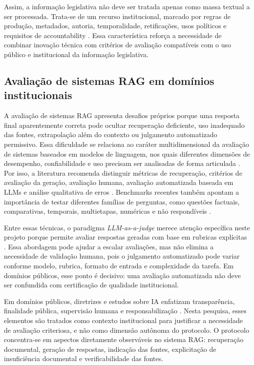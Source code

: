 Assim, a informação legislativa não deve ser tratada apenas como massa textual a ser processada. Trata-se de um recurso institucional, marcado por regras de produção, metadados, autoria, temporalidade, retificações, usos políticos e requisitos de accountability \parencite{bandeiraBernardes2016information,martelloteViola2025organizacaoConhecimento}. Essa característica reforça a necessidade de combinar inovação técnica com critérios de avaliação compatíveis com o uso público e institucional da informação legislativa.

\subsection{Avaliação de sistemas RAG em domínios institucionais}

A avaliação de sistemas RAG apresenta desafios próprios porque uma resposta final aparentemente correta pode ocultar recuperação deficiente, uso inadequado das fontes, extrapolação além do contexto ou julgamento automatizado permissivo. Essa dificuldade se relaciona ao caráter multidimensional da avaliação de sistemas baseados em modelos de linguagem, nos quais diferentes dimensões de desempenho, confiabilidade e uso precisam ser analisadas de forma articulada \parencite{liangEtAl2023helm}. Por isso, a literatura recomenda distinguir métricas de recuperação, critérios de avaliação da geração, avaliação humana, avaliação automatizada baseada em LLMs e análise qualitativa de erros \parencite{saadFalconEtAl2024ares,esEtAl2023ragas,pipitoneAlami2024legalbenchRag}. Benchmarks recentes também apontam a importância de testar diferentes famílias de perguntas, como questões factuais, comparativas, temporais, multietapas, numéricas e não respondíveis \parencite{zhuEtAl2025rageval}.

Entre essas técnicas, o paradigma \textit{LLM-as-a-judge} merece atenção específica neste projeto porque permite avaliar respostas geradas com base em rubricas explícitas \parencite{liuEtAl2023geval,liuEtAl2025judgeRag}. Essa abordagem pode ajudar a escalar avaliações, mas não elimina a necessidade de validação humana, pois o julgamento automatizado pode variar conforme modelo, rubrica, formato de entrada e complexidade da tarefa. Em domínios públicos, esse ponto é decisivo: uma avaliação automatizada não deve ser confundida com certificação de qualidade institucional.

Em domínios públicos, diretrizes e estudos sobre IA enfatizam transparência, finalidade pública, supervisão humana e responsabilização \parencite{ipu2024aiParliaments,wfd2023guidelinesAiParliaments,deAlmeidaSantos2025aiGovernance}. Nesta pesquisa, esses elementos são tratados como contexto institucional para justificar a necessidade de avaliação criteriosa, e não como dimensão autônoma do protocolo. O protocolo concentra-se em aspectos diretamente observáveis no sistema RAG: recuperação documental, geração de respostas, indicação das fontes, explicitação de insuficiência documental e verificabilidade das fontes.

